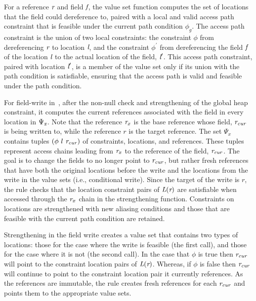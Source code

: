   

For a reference $\emph{r}$ and field $\emph{f}$, the value set function computes 
the set of locations that the field could dereference to, paired with a local and valid access path constraint
that is feasible under the current path condition $\phi_g$.
The access path constraint is the union of two local constraints: 
the constraint $\phi$ from dereferencing $\emph{r}$ to location $\emph{l}$, 
and the constraint $\phi^\prime$ from dereferencing the field $\emph{f}$ of the location $\emph{l}$ to the actual location of the field, $\emph{l}^\prime$. 
This access path constraint, paired with location $\emph{l}^\prime$, is a member of the value set only if its union with the path condition is satisfiable, ensuring that the access path is valid and feasible under the path condition.


For field-write in~, after the non-null check and
strengthening of the global heap constraint, it computes the current
references associated with the field in every location in
$\Psi_{\emph{x}}$. Note that the reference $\emph{r}_x$ is the base
reference whose field, $\emph{r}_\mathit{cur}$ is being written to,
while the reference $r$ is the target reference. The set $\Psi_x$
contains tuples $(\phi\ l\ \cfgnt{r}_\mathit{cur})$ of constraints,
locations, and references. These tuples represent access chains
leading from $\emph{r}_x$ to the reference of the field,
$\emph{r}_\mathit{cur}$. The goal is to change the fields to no
longer point to $\emph{r}_\mathit{cur}$, but rather fresh references
that have both the original locations before the write and the
locations from the write in the value sets (i.e., conditional
write). Since the target of the write is $r$, the rule checks that the
location constraint pairs of $\emph{L}(\emph{r})$ are satisfiable
when accessed through the $\emph{r}_x$ chain in the strengthening
function.   Constraints on locations are strengthened
with new aliasing conditions and those that are feasible with the
current path condition are retained.

Strengthening in the field write creates a value set that contains two
types of locations: those for the case where the write is feasible
(the first call), and those for the case where it is not (the second
call). In the case that $\phi$ is true then $\emph{r}_\mathit{cur}$
will point to the constraint location pairs of $\emph{L}(\emph{r})$.
Whereas, if $\phi$ is false then $\emph{r}_\mathit{cur}$ will
continue to point to the constraint location pair it currently
references.  As the references are immutable, the rule creates fresh
references for each $\emph{r}_\mathit{cur}$ and points them to the
appropriate value sets.

